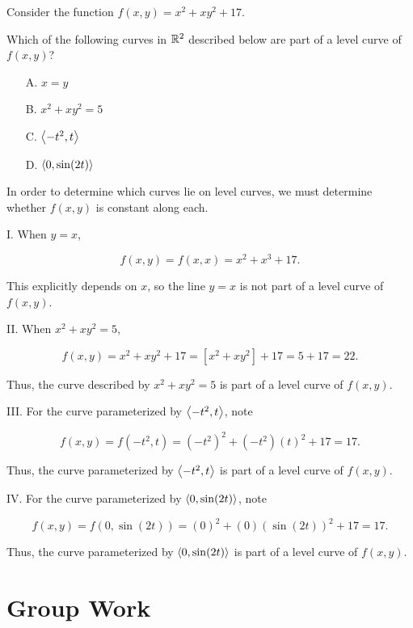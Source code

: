 \documentclass[noauthor]{ximera}
\begin{document}

\begin{problem}
Consider the function $f(x,y) = x^2+xy^2+17$.

Which of the following curves in $\mathbb R^2$ described below are part of a level curve of $f(x,y)$?

\begin{itemize}
\item[A.] $x=y$
\item[B.] $x^2+xy^2=5$
\item[C.] $\left\langle -t^2,t\right\rangle$
\item[D.] $\left\langle 0,\sin(2t)\right\rangle$
\end{itemize}

\begin{freeResponse}
In order to determine which curves lie on level curves, we must determine whether $f(x,y)$ is constant along each.

I. When $y=x$,

\[f(x,y) = f(x,x) =x^2+x^3+17.\]  

This explicitly depends on $x$, so the line $y=x$ is not part of a level curve of $f(x,y)$.

II. When $x^2+xy^2=5$,

\[ f(x,y) = x^2+xy^2+17 = \left[x^2+xy^2\right] +17 = 5+17 = 22.\]

Thus, the curve described by  $x^2+xy^2=5$ is part of a level curve of $f(x,y)$.

III. For the curve parameterized by $\left\langle -t^2,t\right\rangle$, note 

\[f(x,y) = f(-t^2,t) =   (-t^2)^2+(-t^2)(t)^2+17 = 17.\] 

Thus, the curve parameterized by $\left\langle -t^2,t\right\rangle$ is part of a level curve of $f(x,y)$.

IV. For the curve parameterized by $\left\langle 0,\sin(2t)\right\rangle$, note 

\[f(x,y) = f(0,\sin(2t)) =   (0)^2+(0)(\sin(2t))^2+17 = 17.\] 

Thus, the curve parameterized by $\left\langle 0,\sin(2t)\right\rangle$ is part of a level curve of $f(x,y)$.

\end{freeResponse}
\end{problem}


\section{Group Work}
\end{document}
